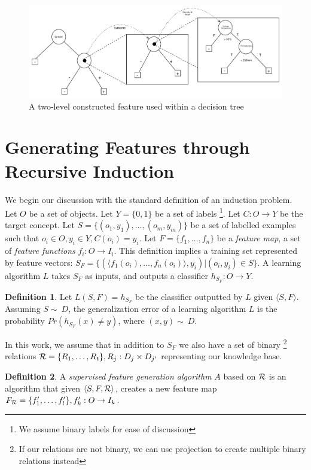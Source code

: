\documentclass[twoside,11pt]{article}
\theoremstyle{definition}
\newtheorem{defn}{Definition}[section]
\begin{document}
\begin{figure}[t]
	\centering
	\includegraphics[width=\linewidth]{fig3.pdf}
	\caption{A two-level constructed feature used within a decision tree}
	\label{fig:lvl2_tree}
\end{figure}

\section{Generating Features through Recursive Induction} \label{formal}

We begin our discussion with the standard definition of an induction problem. 
Let $O$ be a set of objects. Let $Y=\{0,1\}$ be a set of labels \footnote{We assume binary labels for ease of discussion}. Let $C:O\rightarrow Y$ be the target concept. Let $S=\{(o_{1},y_{1}),\ldots,(o_{m},y_{m})\}$ be a set of labelled examples such that $o_{i}\in O, y_{i}\in Y, C(o_i)=y_i$. 
Let $F=\{f_{1},\ldots,f_{n}\}$ be a \emph{feature map}, a set of \emph{feature functions} $f_{i}:O\rightarrow I_{i}$.  This definition implies a training set represented by feature vectors: $S_F=\{ (\langle f_1(o_i),\ldots,f_n(o_i)\rangle, y_i) | (o_i,y_i) \in S\}$. A learning algorithm $L$ takes $S_F$ as inputs, and outputs a classifier $h_{S_F}:O\rightarrow Y$.
\begin{defn}
	Let $L(S,F)=h_{S_F}$ be the classifier outputted by $L$ given $\langle S,F\rangle$. Assuming $S\sim\ D$, the generalization error of a learning algorithm $L$ is the probability $Pr(h_{S_F}(x)\neq y)$, where $(x,y)\sim\ D$.
\end{defn}

In this work, we assume that in addition to $S_F$ we also have a set of binary \footnote{If our relations are not binary, we can use projection to create multiple binary relations instead} relations ${\cal R}=\{R_{1},\ldots,R_{t}\}, R_j:D_j\times D_{j'}$ representing our knowledge base. 
\begin{defn}
	A \emph{supervised feature generation algorithm} $A$ based on ${\cal R}$ is an algorithm that given $\langle S,F,{\cal R} \rangle$, creates a new feature map $F_{{\cal R}}=\{f'_{1},\ldots,f'_{l}\}, f'_{k}:O\rightarrow I_k$.
\end{defn}
\end{document}
